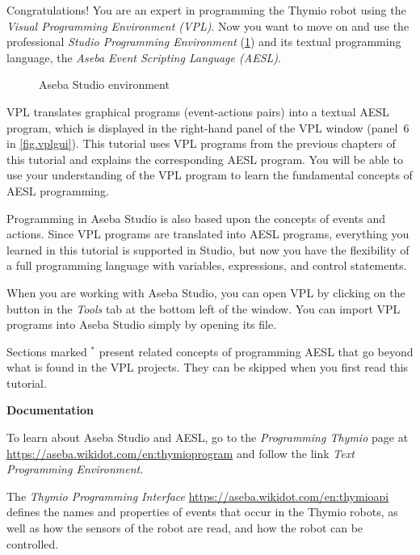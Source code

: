 
\label{ch.next}


Congratulations! You are an expert in programming the Thymio robot using
the \textit{Visual Programming Environment (VPL)}. Now you want to move
on and use the professional \textit{Studio Programming Environment}
(\cref{fig.studio}) and its textual programming language, the
\textit{Aseba Event Scripting Language (AESL)}.

\begin{figure}[hbt]
\begin{center}
\caption{Aseba Studio environment}\label{fig.studio}
\end{center}
\end{figure}

VPL translates graphical programs (event-actions pairs) into a textual
AESL program, which is displayed in the right-hand panel of the VPL
window (panel~6 in \cref{fig.vplgui}). This tutorial uses VPL programs
from the previous chapters of this tutorial and explains the
corresponding AESL program. You will be able to use your understanding
of the VPL program to learn the fundamental concepts of AESL
programming.

Programming in Aseba Studio is also based upon the concepts of events
and actions. Since VPL programs are translated into AESL programs,
everything you learned in this tutorial is supported in Studio, but now
you have the flexibility of a full programming language with variables,
expressions, and control statements.

When you are working with Aseba Studio, you can open VPL by clicking on
the button  in the \emph{Tools} tab at the bottom left of
the window. You can import VPL programs into Aseba Studio simply by
opening its file.

Sections marked $^*$ present related concepts of programming AESL that
go beyond what is found in the VPL projects. They can be skipped when
you first read this tutorial.

\newpage

\textbf{\large Documentation}

To learn about Aseba Studio and AESL, go to the \emph{Programming Thymio} page at
\url{https://aseba.wikidot.com/en:thymioprogram}
and follow the link \emph{Text Programming Environment}.

The \textit{Thymio Programming Interface}
\url{https://aseba.wikidot.com/en:thymioapi}
defines the names and properties of events that occur in the Thymio robots,
as well as how the sensors of the robot are read, and how the robot can
be controlled.

